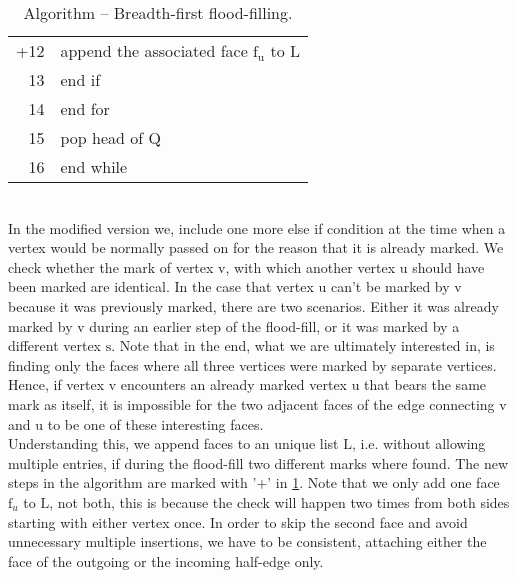 \begin{table}[htb]
{\begin{minipage}{10cm}
\begin{tabular}{r | l}
		\tiny{+12}&	\hspace{2.0cm}	\textsf{append the associated face $\mathrm{f}_{\mathrm{u}}$ to $\mathrm{L}$} \\
		\tiny{13}	&	\hspace{1.6cm}	\textsf{end if} \\
		\tiny{14}	&	\hspace{1.0cm}	\textsf{end for} \\
		\tiny{15}	&	\hspace{1.0cm}	\textsf{pop head of $\mathrm{Q}$} \\
		\tiny{16}	&	\hspace{0.2cm}	\textsf{end while} \\[1ex]
	\end{tabular} \end{minipage}
}
	\medskip
	\caption{Algorithm -- Breadth-first flood-filling.}
	\label{algo:topological_clustering}
\end{table}\\
In the modified version we, include one more \textsf{else if} condition at the time when a vertex would be normally passed on for the reason that it is already marked.
We check whether the mark of vertex $\mathrm{v}$, with which another vertex $\mathrm{u}$ should have been marked are identical.
In the case that vertex $\mathrm{u}$ can't be marked by $\mathrm{v}$ because it was previously marked, there are two scenarios.
Either it was already marked by $\mathrm{v}$ during an earlier step of the flood-fill, or it was marked by a different vertex $\mathrm{s}$.
Note that in the end, what we are ultimately interested in, is finding only the faces where all three vertices were marked by separate vertices.
Hence, if vertex $\mathrm{v}$ encounters an already marked vertex $\mathrm{u}$ that bears the same mark as itself, it is impossible for the two adjacent faces of the edge connecting $\mathrm{v}$ and $\mathrm{u}$ to be one of these interesting faces.\\
Understanding this, we append faces to an unique list $\mathrm{L}$, i.e. without allowing multiple entries, if during the flood-fill two different marks where found.
The new steps in the algorithm are marked with '$+$' in \ref{algo:topological_clustering}.
Note that we only add one face $\mathrm{f}_{u}$ to $\mathrm{L}$, not both, this is because the check will happen two times from both sides starting with either vertex once.
In order to skip the second face and avoid unnecessary multiple insertions, we have to be consistent, attaching either the face of the outgoing or the incoming half-edge only.

